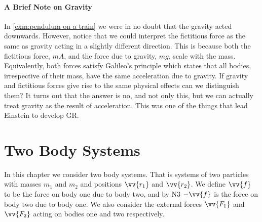     \subsubsection{A Brief Note on Gravity}
    In \cref{exm:pendulum on a train} we were in no doubt that the gravity acted downwards.
    However, notice that we could interpret the fictitious force as the same as gravity acting in a slightly different direction.
    This is because both the fictitious force, \(mA\), and the force due to gravity, \(mg\), scale with the mass.
    Equivalently, both forces satisfy Galileo's principle which states that all bodies, irrespective of their mass, have the same acceleration due to gravity.
    If gravity and fictitious forces give rise to the same physical effects can we distinguish them?
    It turns out that the answer is no, and not only this, but we can actually treat gravity as the result of acceleration.
    This was one of the things that lead Einstein to develop GR.
    
    \chapter{Two Body Systems}
    In this chapter we consider two body systems.
    That is systems of two particles with masses \(m_1\) and \(m_2\) and positions \(\vv{r_1}\) and \(\vv{r_2}\).
    We define \(\vv{f}\) to be the force on body one due to body two, and by N3 \(-\vv{f}\) is the force on body two due to body one.
    We also consider the external forces \(\vv{F_1}\) and \(\vv{F_2}\) acting on bodies one and two respectively.
    
